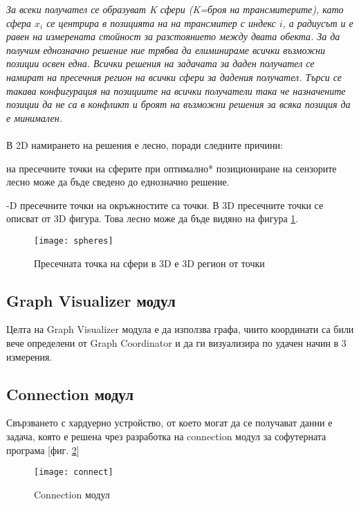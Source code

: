 \textit{За всеки получател се образуват K сфери (K=броя на трансмитерите), като сфера $x_i$ се центрира в позицията на на трансмитер с индекс $i$, а радиусът и е равен на измерената стойност за разстоянието между двата обекта. За да получим еднозначно решение ние трябва да елиминираме всички възможни позиции освен една. Всички решения на задачата за даден получател се намират на пресечния регион на всички сфери за дадения получател. Търси се такава конфигурация на позициите на всички получатели така че назначените позиции да не са в конфликт и броят на възможни решения за всяка позиция да е минимален.}\\\\

В 2D намирането на решения е лесно, поради следните причини:

\begin{enumerate}
     на пресечните точки на сферите при оптимално* позициониране на сензорите лесно може да бъде сведено до еднозначно решение.

    -D пресечните точки на окръжностите са точки. В 3D пресечните точки се описват от 3D фигура. Това лесно може да бъде видяно на фигура \ref{spheres}.
\end{enumerate}

\begin{figure}
    \centerline{\texttt{[image: spheres]}}
    \caption{Пресечната точка на сфери в 3D е 3D регион от точки}
    \label{spheres}
\end{figure}

\pagebreak

\subsection{Graph Visualizer модул}
Целта на Graph Visualizer модула е да използва графа, чиито координати са били вече определени от Graph Coordinator и да ги визуализира по удачен начин в 3 измерения.


\subsection{Connection модул}\label{connModule}
Свързването с хардуерно устройство, от което могат да се получават данни е задача, която е решена чрез разработка на connection модул за софутерната програма [фиг. \ref{fig:connection}]


\begin{figure}
    \centerline{\texttt{[image: connect]}}
    \caption{Connection модул}
    \label{fig:connection}
\end{figure}


